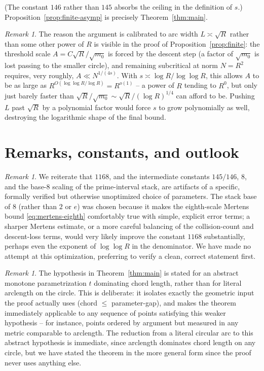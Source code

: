 \documentclass[11pt]{amsart}
\theoremstyle{definition}
\theoremstyle{remark}
\newtheorem{remark}[theorem]{Remark}
\begin{document}
(The constant $146$ rather than $145$ absorbs the ceiling in the definition of $s$.) Proposition~\ref{prop:finite-asymp} is precisely Theorem~\ref{thm:main}.

\begin{remark}\label{rem:scale}
The reason the argument is calibrated to arc width $L \asymp \sqrt R$ rather than some other power of $R$ is visible in the proof of Proposition~\ref{prop:finite}: the threshold scale $A = C\sqrt R/\sqrt{m_0}$ is forced by the descent step (a factor of $\sqrt{m_0}$ is lost passing to the smaller circle), and remaining subcritical at norm $N=R^2$ requires, very roughly, $A \ll N^{1/(4s)}$. With $s\asymp \log R/\log\log R$, this allows $A$ to be as large as $R^{O(\log\log R/\log R)} = R^{o(1)}$ -- a power of $R$ tending to $R^0$, but only just barely faster than $\sqrt{R}/\sqrt{m_0}\sim \sqrt{R}/(\log R)^{1/4}$ can afford to be. Pushing $L$ past $\sqrt R$ by a polynomial factor would force $s$ to grow polynomially as well, destroying the logarithmic shape of the final bound.
\end{remark}

\section{Remarks, constants, and outlook}\label{sec:remarks}

\begin{remark}\label{rem:constants}
We reiterate that $1168$, and the intermediate constants $145/146$, $8$, and the base-$8$ scaling of the prime-interval stack, are artifacts of a specific, formally verified but otherwise unoptimized choice of parameters. The stack base of $8$ (rather than $2$ or $e$) was chosen because it makes the eighth-scale Mertens bound \eqref{eq:mertens-eighth} comfortably true with simple, explicit error terms; a sharper Mertens estimate, or a more careful balancing of the collision-count and descent-loss terms, would very likely improve the constant $1168$ substantially, perhaps even the exponent of $\log\log R$ in the denominator. We have made no attempt at this optimization, preferring to verify a clean, correct statement first.
\end{remark}

\begin{remark}
The hypothesis in Theorem~\ref{thm:main} is stated for an abstract monotone parametrization $t$ dominating chord length, rather than for literal arclength on the circle. This is deliberate: it isolates exactly the geometric input the proof actually uses (chord $\le$ parameter-gap), and makes the theorem immediately applicable to any sequence of points satisfying this weaker hypothesis -- for instance, points ordered by argument but measured in any metric comparable to arclength. The reduction from a literal circular arc to this abstract hypothesis is immediate, since arclength dominates chord length on any circle, but we have stated the theorem in the more general form since the proof never uses anything else.
\end{remark}
\end{document}
